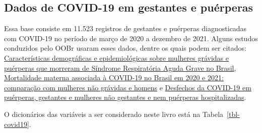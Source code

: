 \documentclass[
  letterpaper,
  DIV=11,
  numbers=noendperiod]{scrreprt}
\begin{document}
\hypertarget{dados-de-covid-19-em-gestantes-e-puuxe9rperas}{%
\subsection{Dados de COVID-19 em gestantes e
puérperas}\label{dados-de-covid-19-em-gestantes-e-puuxe9rperas}}

Essa base consiste em 11.523 registros de gestantes e puérperas
diagnosticadas com COVID-19 no período de março de 2020 a dezembro de
2021. Alguns estudos conduzidos pelo OOBr usaram esses dados, dentre os
quais podem ser citados:
\href{https://observatorioobstetricobr.org/publicacoes/caracteristicas-demograficas-e-epidemiologicas-sobre-mulheres-gravidas-e-puerperas-que-morreram-de-sindrome-respiratoria-aguda-grave-no-brasil/}{Características
demográficas e epidemiológicas sobre mulheres grávidas e puérperas que
morreram de Síndrome Respiratória Aguda Grave no Brasil},
\href{https://observatorioobstetricobr.org/publicacoes/desfechos-da-covid-19-em-puerperas-gestantes-e-mulheres-nao-gestantes-e-nem-puerperas-hospitalizadas/}{Mortalidade
materna associada à COVID-19 no Brasil em 2020 e 2021: comparação com
mulheres não grávidas e homens} e
\href{https://observatorioobstetricobr.org/publicacoes/desfechos-da-covid-em-puerperas-gestantes-mulheres-nao-gestantes-nao-puerperas/}{Desfechos
da COVID-19 em puérperas, gestantes e mulheres não gestantes e nem
puérperas hospitalizadas}.

O dicionários das variáveis a ser considerado neste livro está na
Tabela~\ref{tbl-covid19}.
\end{document}
